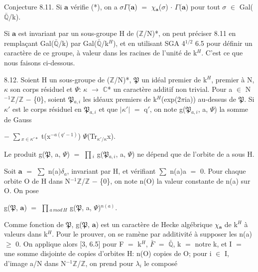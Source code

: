\documentclass[10pt,twoside]{article}
\begin{document}
Conjecture 8.11. Si \ensuremath{𝐚} vérifie (*), on a \ensuremath{σ}\ensuremath{Γ}(\ensuremath{𝐚}) \ensuremath{=} \ensuremath{χ}\ensuremath{_{𝐚}}(\ensuremath{σ}) \ensuremath{·} \ensuremath{Γ}(\ensuremath{𝐚}) pour tout \ensuremath{σ} \ensuremath{∈} Gal(\ensuremath{\bar{ℚ}}/k).\par
Si \ensuremath{𝐚} est invariant par un sous-groupe H de (\ensuremath{ℤ}/N)*, on peut préciser 8.11 en remplaçant Gal(\ensuremath{\bar{ℚ}}/k) par Gal(\ensuremath{\bar{ℚ}}/k\ensuremath{^{H}}), et en utilisant SGA 4\ensuremath{^{1/2}} 6.5 pour définir un caractère de ce groupe, à valeur dans les racines de l’unité de k\ensuremath{^{H}}. C’est ce que nous faisons ci-dessous.\par
8.12. Soient H un sous-groupe de (\ensuremath{ℤ}/N)*, \ensuremath{𝔓} un idéal premier de k\ensuremath{^{H}}, premier à N, \ensuremath{κ} son corps résiduel et \ensuremath{Ψ}: \ensuremath{κ} \ensuremath{→} \ensuremath{ℂ}* un caractère additif non trivial. Pour a \ensuremath{∈} N\ensuremath{^{-1}}\ensuremath{ℤ}/\ensuremath{ℤ} \ensuremath{−} \{0\}, soient \ensuremath{𝔓}\ensuremath{_{a,i}} les idéaux premiers de k\ensuremath{^{H}}(exp(2\ensuremath{π}ia)) au-dessus de \ensuremath{𝔓}. Si \ensuremath{κ}\ensuremath{′} est le corps résiduel en \ensuremath{𝔓}\ensuremath{_{a,i}} et que \ensuremath{|}\ensuremath{κ}\ensuremath{′}\ensuremath{|} \ensuremath{=} q\ensuremath{′}, on note g(\ensuremath{𝔓}\ensuremath{_{a,i}}, a, \ensuremath{Ψ}) la somme de Gauss\par
\ensuremath{−} \ensuremath{∑}\ensuremath{_{x∈κ′*}} t(x\ensuremath{^{−a(q′−1)}}) \ensuremath{Ψ}(Tr\ensuremath{_{κ′/κ}}x).\par
Le produit g(\ensuremath{𝔓}, a, \ensuremath{Ψ}) \ensuremath{=} \ensuremath{∏}\ensuremath{_{i}} g(\ensuremath{𝔓}\ensuremath{_{a,i}}, a, \ensuremath{Ψ}) ne dépend que de l’orbite de a sous H.\par
Soit \ensuremath{𝐚} \ensuremath{=} \ensuremath{∑} n(a)\ensuremath{δ}\ensuremath{_{a}}, invariant par H, et vérifiant \ensuremath{∑} n(a)a \ensuremath{=} 0. Pour chaque orbite O de H dans N\ensuremath{^{-1}}\ensuremath{ℤ}/\ensuremath{ℤ} \ensuremath{−} \{0\}, on note n(O) la valeur constante de n(a) sur O. On pose\par
g(\ensuremath{𝔓}, \ensuremath{𝐚}) \ensuremath{=} \ensuremath{∏}\ensuremath{_{a\,mod\,H}} g(\ensuremath{𝔓}, a, \ensuremath{Ψ})\ensuremath{^{n(a)}}.\par
Comme fonction de \ensuremath{𝔓}, g(\ensuremath{𝔓}, \ensuremath{𝐚}) est un caractère de Hecke algébrique \ensuremath{χ}\ensuremath{_{𝐚}} de k\ensuremath{^{H}} à valeurs dans k\ensuremath{^{H}}. Pour le prouver, on se ramène par additivité à supposer les n(a) \ensuremath{≥} 0. On applique alors [3, 6.5] pour F \ensuremath{=} k\ensuremath{^{H}}, \ensuremath{\bar{F}} \ensuremath{=} \ensuremath{\bar{ℚ}}, k \ensuremath{=} notre k, et I \ensuremath{=} une somme disjointe de copies d’orbites H: n(O) copies de O; pour i \ensuremath{∈} I, d’image a/N dans N\ensuremath{^{-1}}\ensuremath{ℤ}/\ensuremath{ℤ}, on prend pour \ensuremath{λ}\ensuremath{_{i}} le composé\par
\end{document}
